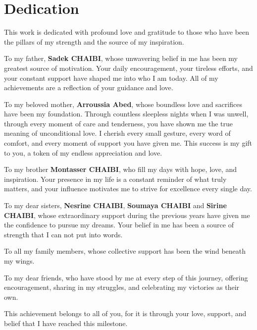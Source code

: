 \newpage
\section*{Dedication}

\vspace{1cm}
This work is dedicated with profound love and gratitude to those who have been the pillars of my strength and the source of my inspiration.
\medskip

To my father, \textbf{Sadek CHAIBI}, whose unwavering belief in me has been my greatest source of motivation. Your daily encouragement, your tireless efforts, and your constant support have shaped me into who I am today.  All of my achievements are a reflection of your guidance and love.
\medskip

To my beloved mother, \textbf{Arroussia Abed}, whose boundless love and sacrifices have been my foundation. Through countless sleepless nights when I was unwell, through every moment of care and tenderness, you have shown me the true meaning of unconditional love. I cherish every small gesture, every word of comfort, and every moment of support you have given me. This success is my gift to you, a token of my endless appreciation and love.
\medskip

To my brother \textbf{Montasser CHAIBI}, who fill my days with hope, love, and inspiration. Your presence in my life is a constant reminder of what truly matters, and your influence motivates me to strive for excellence every single day.
\medskip

To my dear sisters, \textbf{Nesrine CHAIBI}, \textbf{Soumaya CHAIBI} and \textbf{Sirine CHAIBI}, whose extraordinary support during the previous years have given me the confidence to pursue my dreams. Your belief in me has been a source of strength that I can not put into words.
\medskip

To all my family members, whose collective support has been the wind beneath my wings.
\medskip

To my dear friends, who have stood by me at every step of this journey, offering encouragement, sharing in my struggles, and celebrating my victories as their own.
\medskip

This achievement belongs to all of you, for it is through your love, support, and belief that I have reached this milestone.
